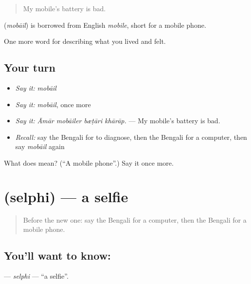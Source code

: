 \begin{quote}
My mobile's battery is bad.
\end{quote}

\begin{cousinweb}
\textbf{} (\emph{mobāil}) is borrowed from English \emph{mobile}, short for a mobile phone.
\end{cousinweb}

\begin{grammarlens}[title={What you've built}]
One more word for describing what you lived and felt.
\end{grammarlens}

\subsection*{Your turn}
\begin{itemize}
\raggedright
  \item \emph{Say it:} \emph{mobāil}
  \item \emph{Say it:} \emph{mobāil}, once more
  \item \emph{Say it:} \emph{Āmār mobāiler bæṭāri khārāp.} — My mobile's battery is bad.
  \item \emph{Recall:} say the Bengali for to diagnose, then the Bengali for a computer, then say \emph{mobāil} again
\end{itemize}

\begin{tcolorbox}[breakable,colback=teal!4,colframe=teal!35!black,title={Before you move on}]
What does  mean? (\textquotedblleft{}A mobile phone\textquotedblright{}.) Say it once more.
\end{tcolorbox}
\section[\texorpdfstring{\bn{সেলফি} (selphi)}{সেলফি (selphi)}]{ (selphi) — a selfie}

\label{lesson:BN-C502-selphi}



\begin{quote}
Before the new one: say the Bengali for a computer, then the Bengali for a mobile phone.
\end{quote}

\subsection*{You'll want to know: }
\textbf{} — \emph{selphi} — \textquotedblleft{}a selfie\textquotedblright{}.

